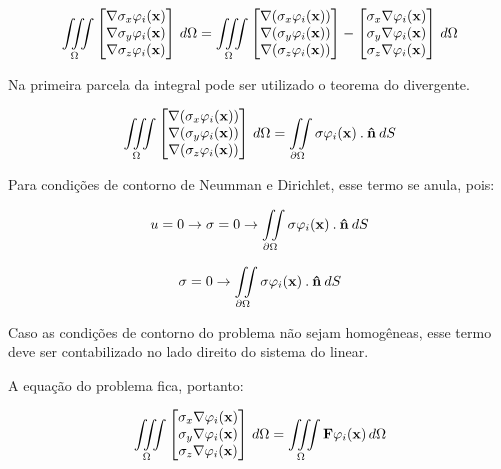 \begin{equation}
\iiint\limits_{\Omega} 
\begin{bmatrix}
\nabla \sigma_x \varphi_i(\mathbf{x})\\ \nabla \sigma_y \varphi_i(\mathbf{x}) \\ \nabla \sigma_z \varphi_i(\mathbf{x})
\end{bmatrix} \, d\Omega = \iiint\limits_{\Omega} 
\begin{bmatrix}
\nabla (\sigma_x \varphi_i(\mathbf{x}))\\ \nabla (\sigma_y \varphi_i(\mathbf{x})) \\ \nabla (\sigma_z \varphi_i(\mathbf{x}))
\end{bmatrix}
-
\begin{bmatrix}
 \sigma_x \nabla \varphi_i(\mathbf{x})\\  \sigma_y \nabla \varphi_i(\mathbf{x}) \\  \sigma_z \nabla \varphi_i(\mathbf{x})
\end{bmatrix}
 \, d\Omega
\end{equation}

Na primeira parcela da integral pode ser utilizado o teorema do divergente.



\begin{equation}
\iiint\limits_{\Omega} 
\begin{bmatrix}
\nabla (\sigma_x \varphi_i(\mathbf{x}))\\ \nabla (\sigma_y \varphi_i(\mathbf{x})) \\ \nabla (\sigma_z \varphi_i(\mathbf{x}))
\end{bmatrix}
 \, d\Omega
=
\iint\limits_{\partial \Omega} \sigma \varphi_i(\mathbf{x}) \: . \: \mathbf{\hat{n}} \: dS
\end{equation}

Para condições de contorno de Neumman e Dirichlet, esse termo se anula, pois:

\begin{equation*}
    u = 0 \rightarrow \sigma = 0 \rightarrow \iint\limits_{\partial \Omega} \sigma \varphi_i(\mathbf{x}) \: . \: \mathbf{\hat{n}} \: dS
\end{equation*}

\begin{equation*}
     \sigma = 0 \rightarrow \iint\limits_{\partial \Omega} \sigma \varphi_i(\mathbf{x}) \: . \: \mathbf{\hat{n}} \: dS
\end{equation*}

Caso as condições de contorno do problema não sejam homogêneas, esse termo deve ser contabilizado no lado direito do sistema do linear.

A equação do problema fica, portanto:

\begin{equation}
\iiint\limits_{\Omega} 
\begin{bmatrix}
 \sigma_x \nabla \varphi_i(\mathbf{x})\\  \sigma_y \nabla \varphi_i(\mathbf{x}) \\  \sigma_z \nabla \varphi_i(\mathbf{x})
\end{bmatrix} \, d\Omega
= \iiint\limits_{\Omega} \mathbf{F}\varphi_i(\mathbf{x}) \, d\Omega
\end{equation}


